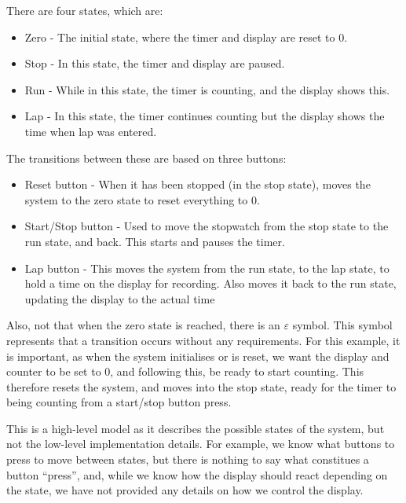\noindent There are four states, which are:

\begin{itemize}

\item Zero - The initial state, where the timer and display are reset to 0. 

\item Stop - In this state, the timer and display are paused.

\item Run - While in this state, the timer is counting, and the display shows this.

\item Lap - In this state, the timer continues counting but the display shows the time when lap was entered.

\end{itemize}

\noindent The transitions between these are based on three buttons:

\begin{itemize} 

\item Reset button - When it has been stopped (in the stop state), moves the system to the zero state to reset everything to 0.

\item Start/Stop button - Used to move the stopwatch from the stop state to the run state, and back. This starts and pauses the timer. 

\item Lap button - This moves the system from the run state, to the lap state, to hold a time on the display for recording. 
                              Also moves it back to the run state, updating the display to the actual time
                              
\end{itemize}

\noindent Also, not that when the zero state is reached, there is an $\varepsilon$ symbol. This symbol represents that
a transition occurs without any requirements. For this example, it is important, as when the system initialises or is reset, we 
want the display and counter to be set to 0, and following this, be ready to start counting. This therefore resets the system, and
moves into the stop state, ready for the timer to being counting from a start/stop button press. 

This is a high-level model as it describes the possible states of the system, but not the low-level implementation details. 
For example, we know what buttons to press to move between states, but there is nothing to say what constitues a button ``press'', 
and, while we know how the display should react depending on the state, we have not provided any details on how we control the display. 

